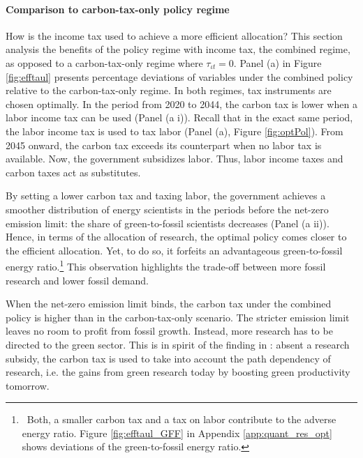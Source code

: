 \paragraph{Comparison to carbon-tax-only policy regime}
How is the income tax used to achieve a more efficient allocation?
This section analysis the benefits of the policy regime with income tax, the {combined} regime, as opposed to a {carbon-tax-only} regime where $\tau_{\iota t}=0$.  
Panel (a)  in Figure \ref{fig:efftaul} presents percentage deviations of variables under the combined policy relative to the carbon-tax-only regime. In both regimes, tax instruments are chosen optimally. In the period from 2020 to 2044, the carbon tax is lower when a labor income tax can be used (Panel (a i)). Recall that in the exact same period, the labor income tax is used to tax labor (Panel (a), Figure \ref{fig:optPol}). From 2045 onward, the carbon tax exceeds its counterpart when no labor tax is available. Now, the government subsidizes labor. Thus, labor income taxes and carbon taxes act as substitutes.

By setting a lower carbon tax and taxing labor, the government achieves a smoother distribution of energy scientists in the periods before the net-zero emission limit: the share of green-to-fossil scientists decreases (Panel (a ii)). 
Hence, in terms of the allocation of research, the optimal policy comes closer to the efficient allocation. Yet, to do so, it forfeits an advantageous green-to-fossil energy ratio.\footnote{ \ Both, a smaller carbon tax and a tax on labor contribute to the adverse energy ratio. Figure \ref{fig:efftaul_GFF} in Appendix \ref{app:quant_res_opt} shows deviations of the green-to-fossil energy ratio.} This observation highlights the trade-off between more fossil research and lower fossil demand. 

When the net-zero emission limit binds, the carbon tax under the combined policy is higher than in the carbon-tax-only scenario.
 The  stricter emission limit leaves no room to profit from fossil growth. Instead, more research has to be directed to the green sector. This is in spirit of the finding in \cite{Acemoglu2012TheChange}: absent a research subsidy, the carbon tax is used to take into account the path dependency of research, i.e. the gains from green research today by boosting green productivity tomorrow.
 
